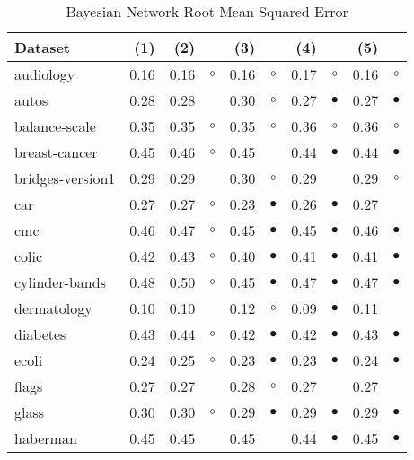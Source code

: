 \begin{table}[thb]
\caption{\label{bnrmse}Bayesian Network Root Mean Squared Error}
\footnotesize
{\centering \begin{tabular}{lrr@{\hspace{0.1cm}}cr@{\hspace{0.1cm}}cr@{\hspace{0.1cm}}cr@{\hspace{0.1cm}}c}
\\
\hline
Dataset & (1)& (2) & & (3) & & (4) & & (5) & \\
\hline
audiology & 0.16 & 0.16 &   $\circ$ & 0.16 &   $\circ$ & 0.17 &   $\circ$ & 0.16 &    $\circ$\\
autos & 0.28 & 0.28 &           & 0.30 &   $\circ$ & 0.27 & $\bullet$ & 0.27 &  $\bullet$\\
balance-scale & 0.35 & 0.35 &   $\circ$ & 0.35 &   $\circ$ & 0.36 &   $\circ$ & 0.36 &    $\circ$\\
breast-cancer & 0.45 & 0.46 &   $\circ$ & 0.45 &           & 0.44 & $\bullet$ & 0.44 &  $\bullet$\\
bridges-version1 & 0.29 & 0.29 &           & 0.30 &   $\circ$ & 0.29 &           & 0.29 &    $\circ$\\
car & 0.27 & 0.27 &   $\circ$ & 0.23 & $\bullet$ & 0.26 & $\bullet$ & 0.27 &           \\
cmc & 0.46 & 0.47 &   $\circ$ & 0.45 & $\bullet$ & 0.45 & $\bullet$ & 0.46 &  $\bullet$\\
colic & 0.42 & 0.43 &   $\circ$ & 0.40 & $\bullet$ & 0.41 & $\bullet$ & 0.41 &  $\bullet$\\
cylinder-bands & 0.48 & 0.50 &   $\circ$ & 0.45 & $\bullet$ & 0.47 & $\bullet$ & 0.47 &  $\bullet$\\
dermatology & 0.10 & 0.10 &           & 0.12 &   $\circ$ & 0.09 & $\bullet$ & 0.11 &           \\
diabetes & 0.43 & 0.44 &   $\circ$ & 0.42 & $\bullet$ & 0.42 & $\bullet$ & 0.43 &  $\bullet$\\
ecoli & 0.24 & 0.25 &   $\circ$ & 0.23 & $\bullet$ & 0.23 & $\bullet$ & 0.24 &  $\bullet$\\
flags & 0.27 & 0.27 &           & 0.28 &   $\circ$ & 0.27 &           & 0.27 &           \\
glass & 0.30 & 0.30 &   $\circ$ & 0.29 & $\bullet$ & 0.29 & $\bullet$ & 0.29 &  $\bullet$\\
haberman & 0.45 & 0.45 &           & 0.45 &           & 0.44 & $\bullet$ & 0.45 &  $\bullet$\\

\end{tabular}}
\end{table}
